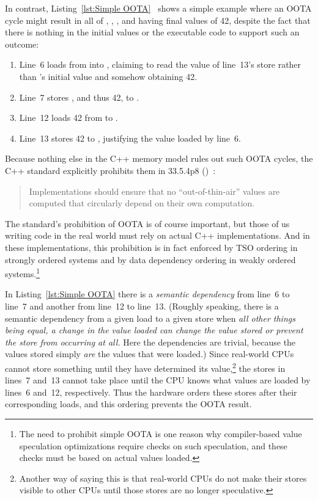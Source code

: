 \documentclass[10]{article}
\begin{document}
In contrast,
Listing~\ref{lst:Simple OOTA}~\cite{PaulEMcKenney2020RelaxedGuideRelaxed}
shows a simple example where an OOTA cycle might result in all of ,
, , and  having final values of 42, despite the fact
that there is nothing in the initial values or the executable code to
support such an outcome:

\begin{enumerate}
\item   Line~6 loads from  into , claiming to read
	the value of line~13's store rather than 's initial value
	and somehow obtaining 42.
\item   Line~7 stores , and thus 42, to .
\item   Line~12 loads 42 from  to .
\item   Line~13 stores 42 to , justifying the value loaded by line~6.
\end{enumerate}

Because nothing else in the C++ memory model rules out such OOTA cycles,
the C++ standard explicitly prohibits them in 33.5.4p8
()~\cite{ThomasKoeppe2023N4950}:
\begin{quote}
	Implementations should ensure that no “out-of-thin-air” values
	are computed that circularly depend on their own computation.
\end{quote}
The standard's prohibition of OOTA is of course important, but those of us
writing code in the real world must rely on actual C++ implementations.
And in these implementations, this prohibition is in fact enforced by TSO
ordering in strongly ordered systems and by data dependency ordering in
weakly ordered systems.\footnote{
	The need to prohibit simple OOTA is one reason why compiler-based
	value speculation optimizations require checks on such
	speculation, and these checks must be based on actual values
	loaded.}

In Listing~\ref{lst:Simple OOTA}
there is a \emph{semantic dependency} from line~6 to line~7 and
another from line~12 to line~13.
(Roughly speaking, there is a semantic dependency from a given load
to a given store when \emph{all other things being equal, a change in the
value loaded can change the value stored or prevent the store from
occurring at all.}
Here the dependencies are trivial, because the values stored simply
\emph{are} the values that were loaded.)
Since real-world CPUs cannot store something
until they have determined its value,\footnote{
	Another way of saying this is that real-world CPUs do not
	make their stores visible to other CPUs until those stores
	are no longer speculative.}
the stores in lines~7 and~13 cannot take place until the CPU
knows what values are loaded by lines~6 and~12, respectively.
Thus the hardware orders these stores after their corresponding loads,
and this ordering prevents the OOTA result.
\end{document}
